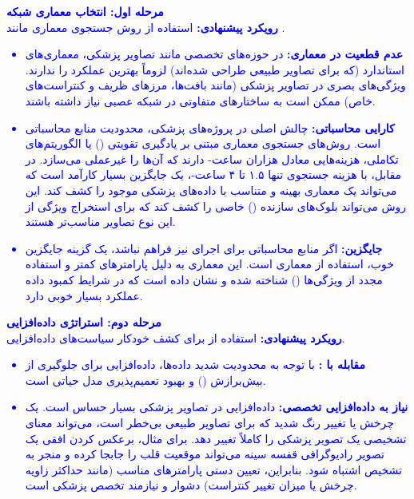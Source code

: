 \documentclass[12pt]{article}
\begin{document}
\begin{enumerate}
    \textcolor{blue}{
        \textbf{مرحله اول: انتخاب معماری شبکه}\\
        \textbf{رویکرد پیشنهادی:} استفاده از روش جستجوی معماری مانند  .
        \begin{itemize}
            \item \textbf{عدم قطعیت در معماری:}  
            در حوزه‌های تخصصی مانند تصاویر پزشکی، معماری‌های استاندارد (که برای تصاویر طبیعی طراحی شده‌اند) لزوماً بهترین عملکرد را ندارند. ویژگی‌های بصری در تصاویر پزشکی (مانند بافت‌ها، مرزهای ظریف و کنتراست‌های خاص) ممکن است به ساختارهای متفاوتی در شبکه عصبی نیاز داشته باشند.
            \item \textbf{کارایی محاسباتی:}  
            چالش اصلی در پروژه‌های پزشکی، محدودیت منابع محاسباتی است. روش‌های جستجوی معماری مبتنی بر یادگیری تقویتی () یا الگوریتم‌های تکاملی، هزینه‌هایی معادل هزاران ساعت- دارند که آن‌ها را غیرعملی می‌سازد. در مقابل،  با هزینه جستجوی تنها ۱.۵ تا ۴ ساعت-، یک جایگزین بسیار کارآمد است که می‌تواند یک معماری بهینه و متناسب با داده‌های پزشکی موجود را کشف کند. این روش می‌تواند بلوک‌های سازنده () خاصی را کشف کند که برای استخراج ویژگی از این نوع تصاویر مناسب‌تر هستند.
            \item \textbf{جایگزین:}  
            اگر منابع محاسباتی برای اجرای  نیز فراهم نباشد، یک گزینه جایگزین خوب، استفاده از معماری  است. این معماری به دلیل پارامترهای کمتر و استفاده مجدد از ویژگی‌ها () شناخته شده و نشان داده است که در شرایط کمبود داده عملکرد بسیار خوبی دارد.
        \end{itemize}
        \textbf{مرحله دوم: استراتژی داده‌افزایی}\\
        \textbf{رویکرد پیشنهادی:} استفاده از  برای کشف خودکار سیاست‌های داده‌افزایی.
        \begin{itemize}
            \item \textbf{مقابله با :}  
            با توجه به محدودیت شدید داده‌ها، داده‌افزایی برای جلوگیری از بیش‌برازش () و بهبود تعمیم‌پذیری مدل حیاتی است.
            \item \textbf{نیاز به داده‌افزایی تخصصی:}  
            داده‌افزایی در تصاویر پزشکی بسیار حساس است. یک چرخش یا تغییر رنگ شدید که برای تصاویر طبیعی بی‌خطر است، می‌تواند معنای تشخیصی یک تصویر پزشکی را کاملاً تغییر دهد. برای مثال، برعکس کردن افقی یک تصویر رادیوگرافی قفسه سینه می‌تواند موقعیت قلب را جابجا کرده و منجر به تشخیص اشتباه شود. بنابراین، تعیین دستی پارامترهای مناسب (مانند حداکثر زاویه چرخش یا میزان تغییر کنتراست) دشوار و نیازمند تخصص پزشکی است.

\end{itemize}}
\end{enumerate}
\end{document}
